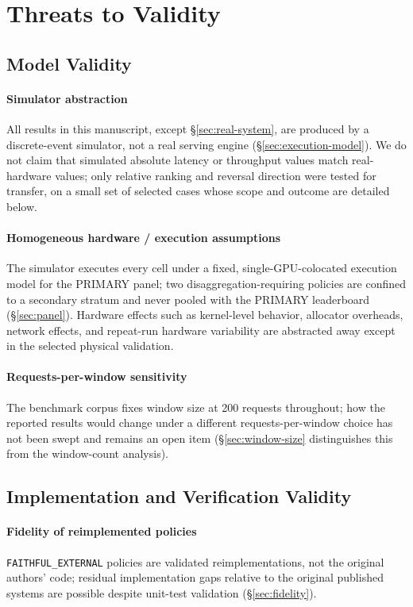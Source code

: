 \section{Threats to Validity}
\label{sec:threats}

\subsection{Model Validity}

\paragraph{Simulator abstraction} All results in this manuscript, except
\S\ref{sec:real-system}, are produced by a discrete-event simulator, not a
real serving engine (\S\ref{sec:execution-model}). We do not claim that
simulated absolute latency or throughput values match real-hardware
values; only relative ranking and reversal direction were tested for
transfer, on a small set of selected cases whose scope and outcome are
detailed below.

\paragraph{Homogeneous hardware / execution assumptions} The simulator
executes every cell under a fixed, single-GPU-colocated execution model for
the PRIMARY panel; two disaggregation-requiring policies are confined to a
secondary stratum and never pooled with the PRIMARY leaderboard
(\S\ref{sec:panel}). Hardware effects such as kernel-level behavior,
allocator overheads, network effects, and repeat-run hardware variability
are abstracted away except in the selected physical validation.

\paragraph{Requests-per-window sensitivity} The benchmark corpus fixes
window size at 200 requests throughout; how the reported results would
change under a different requests-per-window choice has not been swept and
remains an open item (\S\ref{sec:window-size} distinguishes this from the
window-count analysis).

\subsection{Implementation and Verification Validity}

\paragraph{Fidelity of reimplemented policies} \texttt{FAITHFUL\_EXTERNAL}
policies are validated reimplementations, not the original authors' code;
residual implementation gaps relative to the original published systems
are possible despite unit-test validation (\S\ref{sec:fidelity}).

